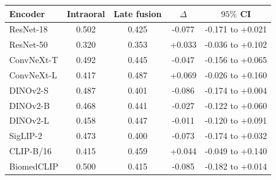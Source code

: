 \begin{tabular}{@{}lcccc@{}}\toprule
Encoder & Intraoral & Late fusion & $\Delta$ & $95\%$ CI\\\midrule
ResNet-18 & 0.502 & 0.425 & -0.077 & -0.171 to +0.021\\
ResNet-50 & 0.320 & 0.353 & +0.033 & -0.036 to +0.102\\
ConvNeXt-T & 0.492 & 0.445 & -0.047 & -0.156 to +0.065\\
ConvNeXt-L & 0.417 & 0.487 & +0.069 & -0.026 to +0.160\\
DINOv2-S & 0.487 & 0.401 & -0.086 & -0.174 to +0.004\\
DINOv2-B & 0.468 & 0.441 & -0.027 & -0.122 to +0.060\\
DINOv2-L & 0.458 & 0.447 & -0.011 & -0.120 to +0.091\\
SigLIP-2 & 0.473 & 0.400 & -0.073 & -0.174 to +0.032\\
CLIP-B/16 & 0.415 & 0.459 & +0.044 & -0.049 to +0.140\\
BiomedCLIP & 0.500 & 0.415 & -0.085 & -0.182 to +0.014\\
\bottomrule\end{tabular}
